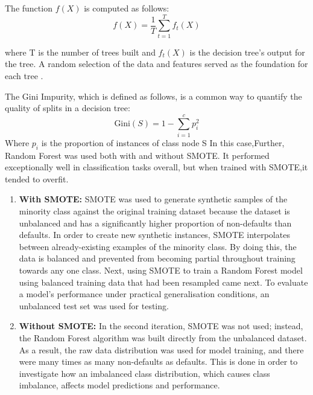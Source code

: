 \documentclass[12pt, a4paper,oneside]{book}
\numberwithin{equation}{section}
\begin{document}
The function \( f(X) \) is computed as follows:
\[f(X) = \frac{1}{T} \sum_{t=1}^{T} f_t(X)\]

where T is the number of trees built and \( f_t(X) \) is the decision tree's output for the tree. A random selection of the data and features served as the foundation for each tree \cite{breiman2001random}.

The Gini Impurity, which is defined as follows, is a common way to quantify the quality of splits in a decision tree:
\[\text{Gini}(S) = 1 - \sum_{i=1}^{c} p_i^2\]
Where $p_i$  is the proportion of instances of class node S In this case,Further, Random Forest was used both with and without SMOTE. It performed exceptionally well in classification tasks overall, but when trained with SMOTE,it tended to overfit.

\begin{enumerate}
    \item \textbf{With SMOTE:} \newline
    SMOTE was used to generate synthetic samples of the minority class against the original training dataset because the dataset is unbalanced and has a significantly higher proportion of non-defaults than defaults. In order to create new synthetic instances, SMOTE interpolates between already-existing examples of the minority class. By doing this, the data is balanced and prevented from becoming partial throughout training towards any one class. 
    Next, using SMOTE to train a Random Forest model using balanced training data that had been resampled came next. To evaluate a model's performance under practical generalisation conditions, an unbalanced test set was used for testing.

     \item \textbf{Without SMOTE:} \newline
     In the second iteration, SMOTE was not used; instead, the Random Forest algorithm was built directly from the unbalanced dataset. As a result, the raw data distribution was used for model training, and there were many times as many non-defaults as defaults. This is done in order to investigate how an imbalanced class distribution, which causes class imbalance, affects model predictions and performance.
 
\end{enumerate}
 
\end{document}
